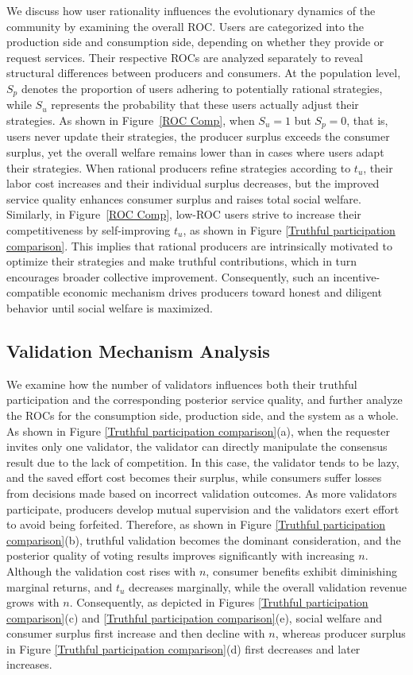 We discuss how user rationality influences the evolutionary dynamics of the community by examining the overall ROC.
Users are categorized into the production side and consumption side, depending on whether they provide or request services.
Their respective ROCs are analyzed separately to reveal structural differences between producers and consumers. At the population level, $S_p$ denotes the proportion of users adhering to potentially rational strategies, while $S_u$ represents the probability that these users actually adjust their strategies. As shown in Figure~\ref{ROC Comp}, when $S_u = 1$ but $S_p = 0$, that is, users never update their strategies, the producer surplus exceeds the consumer surplus, yet the overall welfare remains lower than in cases where users adapt their strategies.
When rational producers refine strategies according to $t_u$, their labor cost increases and their individual surplus decreases, but the improved service quality enhances consumer surplus and raises total social welfare. Similarly, in Figure~\ref{ROC Comp}, low-ROC users strive to increase their competitiveness by self-improving $t_u$, as shown in Figure \ref{Truthful participation comparison}.
This implies that rational producers are intrinsically motivated to optimize their strategies and make truthful contributions, which in turn encourages broader collective improvement.
Consequently, such an incentive-compatible economic mechanism drives producers toward honest and diligent behavior until social welfare is maximized.

\vspace{-2mm}
\subsection{Validation Mechanism Analysis}

We examine how the number of validators influences both their truthful participation and the corresponding posterior service quality, and further analyze the ROCs for the consumption side, production side, and the system as a whole. 
As shown in Figure \ref{Truthful participation comparison}(a), when the requester invites only one validator, the validator can directly manipulate the consensus result due to the lack of competition. 
In this case, the validator tends to be lazy, and the saved effort cost becomes their surplus, while consumers suffer losses from decisions made based on incorrect validation outcomes.
As more validators participate, producers develop mutual supervision and the validators exert effort to avoid being forfeited. 
Therefore, as shown in Figure \ref{Truthful participation comparison}(b), truthful validation becomes the dominant consideration, and the posterior quality of voting results improves significantly with increasing $n$. 
Although the validation cost rises with $n$, consumer benefits exhibit diminishing marginal returns, and $t_u$ decreases marginally, while the overall validation revenue grows with $n$. 
Consequently, as depicted in Figures \ref{Truthful participation comparison}(c) and \ref{Truthful participation comparison}(e), social welfare and consumer surplus first increase and then decline with $n$, whereas producer surplus in Figure \ref{Truthful participation comparison}(d) first decreases and later increases.

